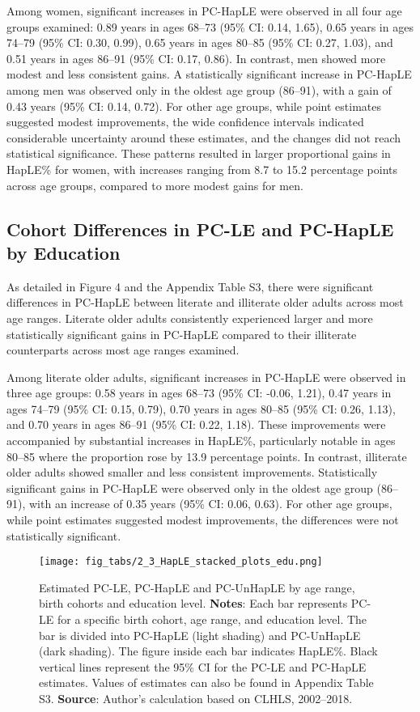 \documentclass[12pt, a4paper]{article}
\begin{document}
Among women, significant increases in PC-HapLE were observed in all four age groups examined: 0.89 years in ages 68–73 (95\% CI: 0.14, 1.65), 0.65 years in ages 74–79 (95\% CI: 0.30, 0.99), 0.65 years in ages 80–85 (95\% CI: 0.27, 1.03), and 0.51 years in ages 86–91 (95\% CI: 0.17, 0.86). In contrast, men showed more modest and less consistent gains. A statistically significant increase in PC-HapLE among men was observed only in the oldest age group (86–91), with a gain of 0.43 years (95\% CI: 0.14, 0.72). For other age groups, while point estimates suggested modest improvements, the wide confidence intervals indicated considerable uncertainty around these estimates, and the changes did not reach statistical significance. These patterns resulted in larger proportional gains in HapLE\% for women, with increases ranging from 8.7 to 15.2 percentage points across age groups, compared to more modest gains for men.

\subsection{Cohort Differences in PC-LE and PC-HapLE by Education}

As detailed in Figure 4 and the Appendix Table S3, there were significant differences in PC-HapLE between literate and illiterate older adults across most age ranges. Literate older adults consistently experienced larger and more statistically significant gains in PC-HapLE compared to their illiterate counterparts across most age ranges examined.

Among literate older adults, significant increases in PC-HapLE were observed in three age groups: 0.58 years in ages 68–73 (95\% CI: -0.06, 1.21), 0.47 years in ages 74–79 (95\% CI: 0.15, 0.79), 0.70 years in ages 80–85 (95\% CI: 0.26, 1.13), and 0.70 years in ages 86–91 (95\% CI: 0.22, 1.18). These improvements were accompanied by substantial increases in HapLE\%, particularly notable in ages 80–85 where the proportion rose by 13.9 percentage points. In contrast, illiterate older adults showed smaller and less consistent improvements. Statistically significant gains in PC-HapLE were observed only in the oldest age group (86–91), with an increase of 0.35 years (95\% CI: 0.06, 0.63). For other age groups, while point estimates suggested modest improvements, the differences were not statistically significant.

\begin{figure}[!p]
  \centering
  \texttt{[image: fig\_tabs/2\_3\_HapLE\_stacked\_plots\_edu.png]}
  \caption{Estimated PC-LE, PC-HapLE and PC-UnHapLE by age range, birth cohorts and education level. \textbf{Notes}: Each bar represents PC-LE for a specific birth cohort, age range, and education level. The bar is divided into PC-HapLE (light shading) and PC-UnHapLE (dark shading). The figure inside each bar indicates HapLE\%. Black vertical lines represent the 95\% CI for the PC-LE and PC-HapLE estimates. Values of estimates can also be found in Appendix Table S3. \textbf{Source}: Author's calculation based on CLHLS, 2002–2018.}
\end{figure}
\end{document}
